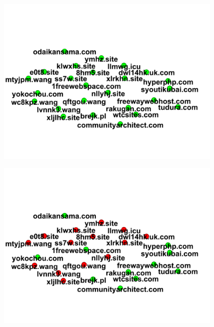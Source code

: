 \documentclass[conference]{IEEEtran}
\begin{document}
\begin{figure}[htbp]
 \centerline{\includegraphics[width=\columnwidth]{figs/06before.png}}
 \caption{}
\end{figure}

\begin{figure}[htbp]
 \centerline{\includegraphics[width=\columnwidth]{figs/06after.png}}
 \caption{}
\end{figure}
\end{document}
